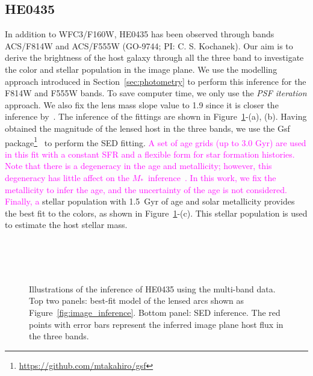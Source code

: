 \documentclass[fleqn,usenatbib]{mnras}
\newcommand{\mstar}{{$M_*$}}
\newcommand{\pink}[1]{{\textcolor{magenta}{#1}}}
\begin{document}
\subsection{HE0435}\label{app:HE0435}
In addition to WFC3/F160W, HE0435 has been observed through bands ACS/F814W and ACS/F555W (GO-9744; PI: C. S. Kochanek). Our aim is to derive the brightness of the host galaxy through all the three band to investigate the color and stellar population in the image plane. We use the modelling approach introduced in Section~\ref{sec:photometry} to perform this inference for the F814W and F555W bands. To save computer time, we only use the {\it PSF iteration} approach. We also fix the lens mass slope value to 1.9 since it is closer the inference by~\citet[][i.e., $\gamma\sim1.93$]{Wong2017}. The inference of the fittings are shown in Figure~\ref{fig:app_HE0435}-(a), (b). Having obtained the magnitude of the lensed host in the three bands, we use the {\sc Gsf} package\footnote{\url{https://github.com/mtakahiro/gsf}}~\citep{Morishita2019} to perform the SED fitting. \pink{A set of age grids (up to 3.0 Gyr) are used in this fit with a constant SFR and a flexible form for star formation histories. Note that there is a degeneracy in the age and metallicity; however, this degeneracy has little affect on the \mstar\ inference~\citep{Bell2001}. In this work, we fix the metallicity to infer the age, and the uncertainty of the age is not considered. Finally, a} stellar population with 1.5~Gyr of age and solar metallicity provides the best fit to the colors, as shown in Figure~\ref{fig:app_HE0435}-(c). This stellar population is used to estimate the host stellar mass.


\begin{figure}
\centering
{}\\
\\
\\
\caption{\label{fig:app_HE0435} 
Illustrations of the inference of HE0435 using the multi-band data. Top two panels: best-fit model of the lensed arcs shown as Figure~\ref{fig:image_inference}. Bottom panel: SED inference. The red points with error bars represent the inferred image plane host flux in the three bands.}
\end{figure} 
\end{document}
